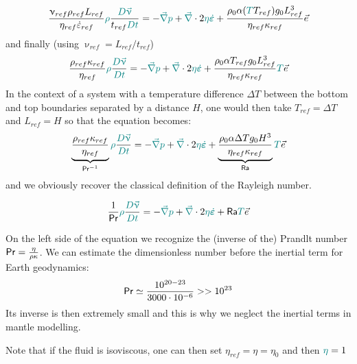 \[
\frac{\upnu_{ref} \rho_{ref} L_{ref}}{\eta_{ref}\dot{\varepsilon}_{ref}  }
{\color{teal}\rho} \frac{{\color{teal} D \vec\upnu}}{ t_{ref} {\color{teal} D t}}
=
-{\color{teal} \vec\nabla} {\color{teal}p} + {\color{teal} \vec\nabla} \cdot 2 {\color{teal} \eta} {\color{teal} \dot{\bm\varepsilon}}
+ \frac{\rho_0\alpha ({\color{teal}T}T_{ref}) g_0 L_{ref}^3}{\eta_{ref} \kappa_{ref}} \vec{e}
\]
and finally (using $\upnu_{ref}=L_{ref}/t_{ref}$) 
\[
\frac{\rho_{ref} \kappa_{ref}}{\eta_{ref}}
{\color{teal}\rho} \frac{{\color{teal} D \vec\upnu}}{\color{teal} D t}
=
-{\color{teal} \vec\nabla} {\color{teal}p} + {\color{teal} \vec\nabla} \cdot 2 {\color{teal} \eta} {\color{teal} \dot{\bm\varepsilon}}
+ \frac{\rho_0\alpha T_{ref} g_0 L_{ref}^3}{\eta_{ref} \kappa_{ref}} {\color{teal} T} \vec{e}
\]
In the context of a system with a temperature difference $\Delta T$ 
between the bottom and top boundaries separated by a distance $H$, one would then take $T_{ref} = \Delta T$ 
and $L_{ref}=H$ so that the equation becomes:
\[
\underbrace{\frac{\rho_{ref} \kappa_{ref}}{\eta_{ref}}}_{{\mathsf{Pr}}^{-1}}
{\color{teal}\rho} \frac{{\color{teal} D \vec\upnu}}{\color{teal} D t}
=
-{\color{teal} \vec\nabla} {\color{teal}p} + {\color{teal} \vec\nabla} \cdot 2 {\color{teal} \eta} {\color{teal} \dot{\bm\varepsilon}}
+ \underbrace{\frac{\rho_0\alpha \Delta T g_0 H^3}{\eta_{ref} \kappa_{ref}} }_{{\mathsf{Ra}}} {\color{teal} T}\vec{e}
\]
and we obviously recover the classical definition of the Rayleigh number.

\begin{mdframed}[backgroundcolor=blue!5]
\[
\frac{1}{{\mathsf{Pr}}}
{\color{teal}\rho} \frac{{\color{teal} D \vec\upnu}}{\color{teal} D t}
=
-{\color{teal} \vec\nabla} {\color{teal}p} + {\color{teal} \vec\nabla} \cdot 2 {\color{teal} \eta} {\color{teal} \dot{\bm\varepsilon}}
+ {\mathsf{Ra}} {\color{teal} T}\vec{e}
\]
\end{mdframed}


On the left side of the equation we recognize the (inverse of the) Prandlt number ${\mathsf{Pr}}=\frac{\eta}{\rho \kappa}$. 
We can estimate the dimensionless number before the inertial term for Earth
geodynamics:
\[
{\mathsf{Pr}} \simeq \frac{10^{20-23}}{3000 \cdot 10^{-6}} >> 10^{23}
\]
Its inverse is then extremely small and this is why we neglect the inertial terms
in mantle modelling.


Note that if the fluid is isoviscous, one can then set $\eta_{ref}=\eta=\eta_0$ and then ${\color{teal}\eta}=1$ 


